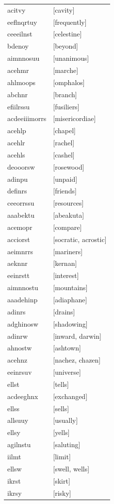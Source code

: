\documentclass{article}
\begin{document}
\begin{tabular}{ll}
acitvy & [cavity] \\
eeflnqrtuy & [frequently] \\
ceeeilnst & [celestine] \\
bdenoy & [beyond] \\
aimnnosuu & [unanimous] \\
acehmr & [marche] \\
ahlmoops & [omphalos] \\
abchnr & [branch] \\
efiilrssu & [fusiliers] \\
acdeeiiimorrs & [misericordiae] \\
acehlp & [chapel] \\
acehlr & [rachel] \\
acehls & [cashel] \\
deooorsw & [rosewood] \\
adinpu & [unpaid] \\
definrs & [friends] \\
ceeorrssu & [resources] \\
aaabektu & [abeakuta] \\
acemopr & [compare] \\
acciorst & [socratic, acrostic] \\
aeimnrrs & [mariners] \\
aeknnr & [kernan] \\
eeinrstt & [interest] \\
aimnnostu & [mountains] \\
aaadehinp & [adiaphane] \\
adinrs & [drains] \\
adghinosw & [shadowing] \\
adinrw & [inward, darwin] \\
ahnostw & [ashtown] \\
acehnz & [nachez, chazen] \\
eeinrsuv & [universe] \\
ellst & [tells] \\
acdeeghnx & [exchanged] \\
ellss & [sells] \\
allsuuy & [usually] \\
ellsy & [yells] \\
agilnstu & [saluting] \\
iilmt & [limit] \\
ellsw & [swell, wells] \\
ikrst & [skirt] \\
ikrsy & [risky] \\

\end{tabular}
\end{document}
